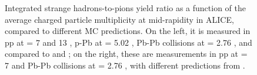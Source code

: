 \begin{figure}[t]
\hspace*{-1.25cm}
\caption{Integrated strange hadrons-to-pions yield ratio as a function of the average charged particle multiplicity at mid-rapidity in ALICE, compared to different MC predictions. On the left, it is measured in pp at \sqrtS = 7 and 13 \tev, p-Pb at \sqrtSnn = 5.02 \tev, Pb-Pb collisions at \sqrtSnn = 2.76 \tev , and compared to \Pythiaeight and \Herwig\cite{acharyaMultiplicityDependencePi2020}; on the right, these are measurements in pp at \sqrtS = 7 \tev and Pb-Pb collisions at \sqrtSnn = 2.76 \tev, with different predictions from \Epos \cite{wernerCorecoronaProcedureMicrocanonical2023}.}
	\label{fig:MCModelStrangenessEnhancement}
\end{figure}

